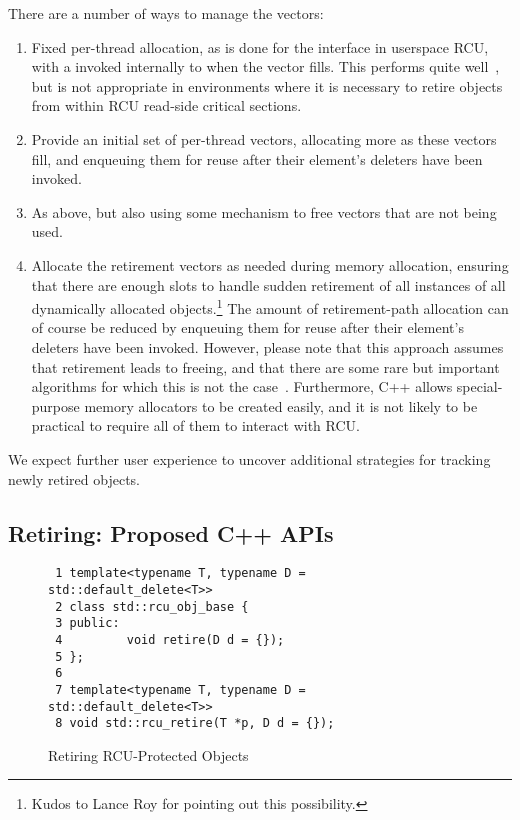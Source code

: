\documentclass[letterpaper,10pt]{article}
\begin{document}
There are a number of ways to manage the vectors:

\begin{enumerate}
\item	Fixed per-thread allocation, as is done for the 
	interface in userspace RCU, with a 
	invoked internally to  when the vector fills.
	This performs quite well~\cite{MathieuDesnoyers2012URCU}, but
	is not appropriate in environments where it is necessary to
	retire objects from within RCU read-side critical sections.
\item	Provide an initial set of per-thread vectors, allocating more
	as these vectors fill, and enqueuing them for reuse after
	their element's deleters have been invoked.
\item	As above, but also using some mechanism to free vectors that
	are not being used.
\item	Allocate the retirement vectors as needed during memory allocation,
	ensuring that there are enough slots to handle sudden
	retirement of all instances of all dynamically allocated
	objects.\footnote{
		Kudos to Lance Roy for pointing out this possibility.}
	The amount of retirement-path allocation can of course be reduced
	by enqueuing them for reuse after their element's deleters have
	been invoked.
	However, please note that this approach assumes
	that retirement leads to freeing, and that there are some
	rare but important algorithms for which this is not the
	case~\cite{GauthamShenoy2006RCUrwlock,SrivatsaSBhat2014RCUrwlock,RanLiu2014PassiveRWLock,PedroRmalhete2015rwlockRCU,McKenney98}.
	Furthermore, C++ allows special-purpose memory allocators to
	be created easily, and it is not likely to be practical to
	require all of them to interact with RCU.
\end{enumerate}

We expect further user experience to uncover additional strategies for
tracking newly retired objects.

\subsection{Retiring: Proposed C++ APIs}
\label{sec:Retiring: Proposed C++ APIs}

\begin{figure}[tbp]
{ \scriptsize
\begin{verbatim}
 1 template<typename T, typename D = std::default_delete<T>>
 2 class std::rcu_obj_base {
 3 public:
 4         void retire(D d = {});
 5 };
 6
 7 template<typename T, typename D = std::default_delete<T>>
 8 void std::rcu_retire(T *p, D d = {});
\end{verbatim}
}
\caption{Retiring RCU-Protected Objects}
\label{fig:Retiring RCU-Protected Objects}
\end{figure}
\end{document}
